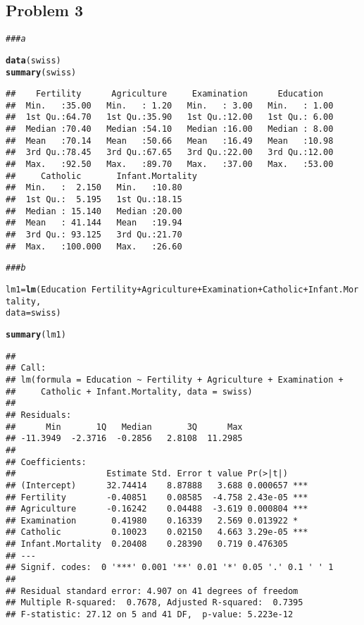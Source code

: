 \documentclass[12pt,letter]{article}\usepackage[]{graphicx}\usepackage[]{color}
\makeatletter
\newcommand{\hlcom}[1]{\textcolor[rgb]{0.678,0.584,0.686}{\textit{#1}}}%
\newcommand{\hlopt}[1]{\textcolor[rgb]{0,0,0}{#1}}%
\newcommand{\hlstd}[1]{\textcolor[rgb]{0.345,0.345,0.345}{#1}}%
\newcommand{\hlkwb}[1]{\textcolor[rgb]{0.69,0.353,0.396}{#1}}%
\newcommand{\hlkwc}[1]{\textcolor[rgb]{0.333,0.667,0.333}{#1}}%
\newcommand{\hlkwd}[1]{\textcolor[rgb]{0.737,0.353,0.396}{\textbf{#1}}}%
\newenvironment{kframe}{%
 \def\at@end@of@kframe{}%
 \ifinner\ifhmode%
  \def\at@end@of@kframe{\end{minipage}}%
  \begin{minipage}{\columnwidth}%
 \fi\fi%
 \def\FrameCommand##1{\hskip\@totalleftmargin \hskip-\fboxsep
 \colorbox{shadecolor}{##1}\hskip-\fboxsep
     \hskip-\linewidth \hskip-\@totalleftmargin \hskip\columnwidth}%
 \MakeFramed {\advance\hsize-\width
   \@totalleftmargin\z@ \linewidth\hsize
   \@setminipage}}%
 {\par\unskip\endMakeFramed%
 \at@end@of@kframe}
\newenvironment{knitrout}{}{} %
\makeatother
\begin{document}
\subsection*{Problem 3}

\begin{knitrout}
\color{fgcolor}\begin{kframe}
\begin{alltt}
\hlcom{### a}

\hlkwd{data}\hlstd{(swiss)}
\hlkwd{summary}\hlstd{(swiss)}
\end{alltt}
\begin{verbatim}
##    Fertility      Agriculture     Examination      Education    
##  Min.   :35.00   Min.   : 1.20   Min.   : 3.00   Min.   : 1.00  
##  1st Qu.:64.70   1st Qu.:35.90   1st Qu.:12.00   1st Qu.: 6.00  
##  Median :70.40   Median :54.10   Median :16.00   Median : 8.00  
##  Mean   :70.14   Mean   :50.66   Mean   :16.49   Mean   :10.98  
##  3rd Qu.:78.45   3rd Qu.:67.65   3rd Qu.:22.00   3rd Qu.:12.00  
##  Max.   :92.50   Max.   :89.70   Max.   :37.00   Max.   :53.00  
##     Catholic       Infant.Mortality
##  Min.   :  2.150   Min.   :10.80   
##  1st Qu.:  5.195   1st Qu.:18.15   
##  Median : 15.140   Median :20.00   
##  Mean   : 41.144   Mean   :19.94   
##  3rd Qu.: 93.125   3rd Qu.:21.70   
##  Max.   :100.000   Max.   :26.60
\end{verbatim}
\begin{alltt}
\hlcom{### b}

\hlstd{lm1} \hlkwb{=} \hlkwd{lm}\hlstd{(Education} \hlopt{~} \hlstd{Fertility} \hlopt{+} \hlstd{Agriculture} \hlopt{+} \hlstd{Examination} \hlopt{+} \hlstd{Catholic} \hlopt{+} \hlstd{Infant.Mortality,}
    \hlkwc{data} \hlstd{= swiss)}

\hlkwd{summary}\hlstd{(lm1)}
\end{alltt}
\begin{verbatim}
## 
## Call:
## lm(formula = Education ~ Fertility + Agriculture + Examination + 
##     Catholic + Infant.Mortality, data = swiss)
## 
## Residuals:
##      Min       1Q   Median       3Q      Max 
## -11.3949  -2.3716  -0.2856   2.8108  11.2985 
## 
## Coefficients:
##                  Estimate Std. Error t value Pr(>|t|)    
## (Intercept)      32.74414    8.87888   3.688 0.000657 ***
## Fertility        -0.40851    0.08585  -4.758 2.43e-05 ***
## Agriculture      -0.16242    0.04488  -3.619 0.000804 ***
## Examination       0.41980    0.16339   2.569 0.013922 *  
## Catholic          0.10023    0.02150   4.663 3.29e-05 ***
## Infant.Mortality  0.20408    0.28390   0.719 0.476305    
## ---
## Signif. codes:  0 '***' 0.001 '**' 0.01 '*' 0.05 '.' 0.1 ' ' 1
## 
## Residual standard error: 4.907 on 41 degrees of freedom
## Multiple R-squared:  0.7678,	Adjusted R-squared:  0.7395 
## F-statistic: 27.12 on 5 and 41 DF,  p-value: 5.223e-12
\end{verbatim}
\end{kframe}
\end{knitrout}
\end{document}
